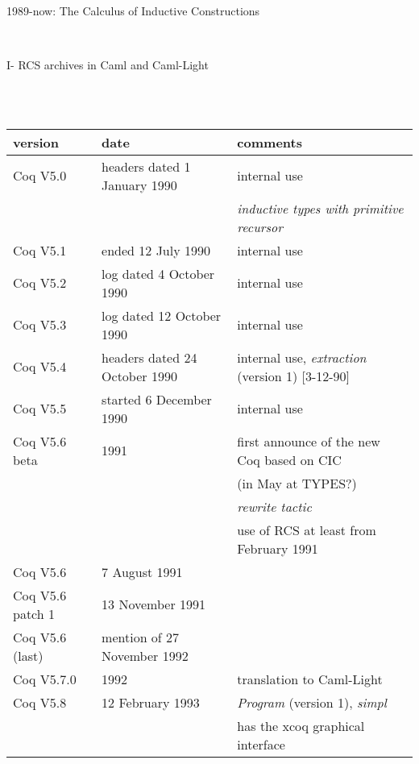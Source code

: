 \documentclass[a4paper]{book}
\newcommand{\feature}[1]{{\em #1}}
\begin{document}
\bigskip
\bigskip

\newpage

\centerline{\large 1989-now: The Calculus of Inductive Constructions}
\mbox{}\\
\centerline{I- RCS archives in Caml and Caml-Light}
\mbox{}\\
\mbox{}\\
\begin{tabular}{l|l|l}
version & date & comments \\
\hline
Coq V5.0 & headers dated 1 January 1990 & internal use \\
  & & \feature{inductive types with primitive recursor}\\

Coq V5.1 & ended 12 July 1990 & internal use \\

Coq V5.2 & log dated 4 October 1990 & internal use \\

Coq V5.3 & log dated 12 October 1990 & internal use \\

Coq V5.4 & headers dated 24 October 1990 & internal use, \feature{extraction} (version 1) [3-12-90]\\

Coq V5.5 & started 6 December 1990 & internal use \\

Coq V5.6 beta & 1991 & first announce of the new Coq based on CIC \\
 & & (in May at TYPES?)\\
 & & \feature{rewrite tactic}\\
 & & use of RCS at least from February 1991\\

Coq V5.6& 7 August 1991 & \\

Coq V5.6 patch 1& 13 November 1991 & \\

Coq V5.6 (last) & mention of 27 November 1992\\

Coq V5.7.0& 1992 & translation to Caml-Light \footnotemark\\

Coq V5.8& 12 February 1993 & \feature{Program} (version 1), \feature{simpl}\\

& & has the xcoq graphical interface\\


\end{tabular}
\end{document}
